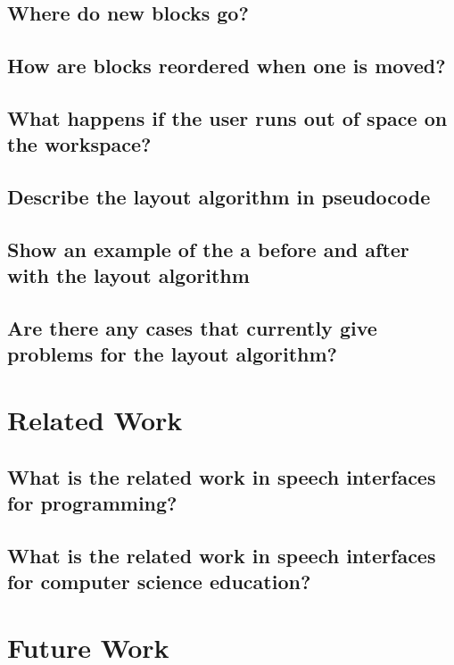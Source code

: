 \documentclass[]{article}
\begin{document}
\subsection{Where do new blocks go?}

\subsection{How are blocks reordered when one is moved?}

\subsection{What happens if the user runs out of space on the workspace?}

\subsection{Describe the layout algorithm in pseudocode}

\subsection{Show an example of the a before and after with the layout algorithm}

\subsection{Are there any cases that currently give problems for the layout algorithm?}


\section{Related Work}

\subsection{What is the related work in speech interfaces for programming?}

\subsection{What is the related work in speech interfaces for computer science education?}


\section{Future Work}
\end{document}
